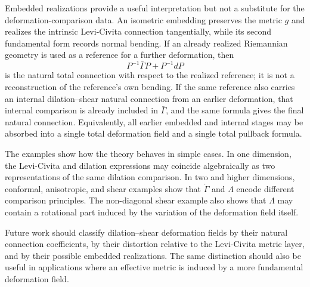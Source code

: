 \documentclass[12pt]{amsart}
\theoremstyle{definition}
\theoremstyle{remark}
\begin{document}
Embedded realizations provide a useful interpretation but not a substitute for the deformation-comparison data.  An isometric embedding preserves the metric \(g\) and realizes the intrinsic Levi-Civita connection tangentially, while its second fundamental form records normal bending.  If an already realized Riemannian geometry is used as a reference for a further deformation, then
\[
 P^{-1}\bar\Gamma P+P^{-1}dP
\]
is the natural total connection with respect to the realized reference; it is not a reconstruction of the reference's own bending.  If the same reference also carries an internal dilation--shear natural connection from an earlier deformation, that internal comparison is already included in \(\bar\Gamma\), and the same formula gives the final natural connection.  Equivalently, all earlier embedded and internal stages may be absorbed into a single total deformation field and a single total pullback formula.

The examples show how the theory behaves in simple cases.  In one dimension, the Levi-Civita and dilation expressions may coincide algebraically as two representations of the same dilation comparison.  In two and higher dimensions, conformal, anisotropic, and shear examples show that \(\mathring\Gamma\) and \(\Lambda\) encode different comparison principles.  The non-diagonal shear example also shows that \(\Lambda\) may contain a rotational part induced by the variation of the deformation field itself.

Future work should classify dilation--shear deformation fields by their natural connection coefficients, by their distortion relative to the Levi-Civita metric layer, and by their possible embedded realizations.  The same distinction should also be useful in applications where an effective metric is induced by a more fundamental deformation field.
\end{document}
